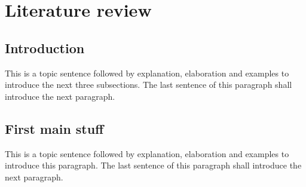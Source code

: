 \chapter{Literature review}
\label{ch:name2}

\section{Introduction}
\label{sec:ch_2_introduction}

This is a topic sentence followed by explanation, elaboration and examples to introduce the next three subsections. The last sentence of this paragraph shall introduce the next paragraph.

\section{First main stuff}
\label{sec:ch_2_firstmain}

This is a topic sentence followed by explanation, elaboration and examples to introduce this paragraph. The last sentence of this paragraph shall introduce the next paragraph.
